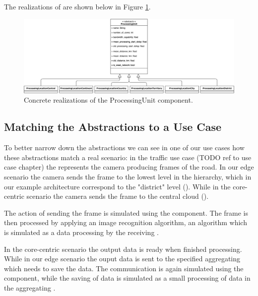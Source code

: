 The realizations of  are shown below in Figure \ref{fig:processing-unit-realizations}.

\begin{figure}[H]
    \centering
    \includegraphics[width=0.99\linewidth]{Figures/Evaluation/processing-unit-realizations.png}
    \caption{Concrete realizations of the ProcessingUnit component.}
    \label{fig:processing-unit-realizations}
\end{figure}


\subsection{Matching the Abstractions to a Use Case}
To better narrow down the abstractions we can see in one of our use cases how these abstractions match a real scenario: in the traffic use case (TODO ref to use case chapter) the  represents the camera producing frames of the road. In our edge scenario the camera sends the frame to the lowest level in the hierarchy, which in our example architecture correspond to the "district" level (). While in the core-centric scenario the camera sends the frame to the central cloud ().

The action of sending the frame is simulated using the  component. The frame is then processed by applying an image recognition algorithm, an algorithm which is simulated as a data processing by the receiving .

In the core-centric scenario the output data is ready when finished processing. While in our edge scenario the ouput data is sent to the specified aggregating  which needs to save the data. The communication is again simulated using the  component, while the saving of data is simulated as a small processing of data in the aggregating .

